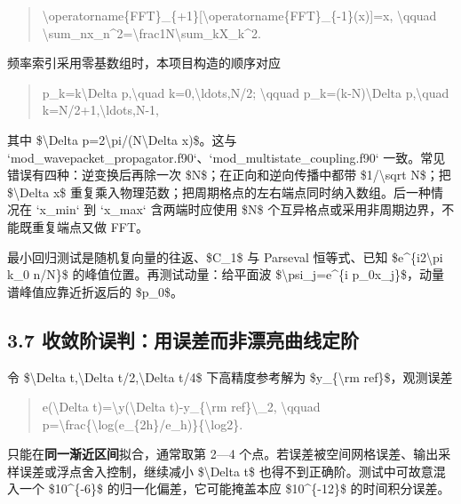 \documentclass[UTF8,openany,11pt,fontset=fandol]{ctexbook}
\begin{document}
\begin{quote}
\textbackslash operatorname\{FFT\}\_\{+1\}{[}\textbackslash operatorname\{FFT\}\_\{-1\}(x){]}=x,
\textbackslash qquad
\textbackslash sum\_n\textbar x\_n\textbar\^{}2=\textbackslash frac1N\textbackslash sum\_k\textbar X\_k\textbar\^{}2.
\end{quote}

频率索引采用零基数组时，本项目构造的顺序对应

\begin{quote}
p\_k=k\textbackslash Delta p,\textbackslash quad
k=0,\textbackslash ldots,N/2; \textbackslash qquad
p\_k=(k-N)\textbackslash Delta p,\textbackslash quad
k=N/2+1,\textbackslash ldots,N-1,
\end{quote}

其中 \$\textbackslash Delta p=2\textbackslash pi/(N\textbackslash Delta
x)\$。这与
`mod\_wavepacket\_propagator.f90`、`mod\_multistate\_coupling.f90`
一致。常见错误有四种：逆变换后再除一次 \$N\$；在正向和逆向传播中都带
\$1/\textbackslash sqrt N\$；把 \$\textbackslash Delta x\$
重复乘入物理范数；把周期格点的左右端点同时纳入数组。后一种情况在
`x\_min` 到 `x\_max` 含两端时应使用 \$N\$
个互异格点或采用非周期边界，不能既重复端点又做 FFT。

最小回归测试是随机复向量的往返、\$C\_1\$ 与 Parseval 恒等式、已知
\$e\^{}\{i2\textbackslash pi k\_0 n/N\}\$
的峰值位置。再测试动量：给平面波 \$\textbackslash psi\_j=e\^{}\{i
p\_0x\_j\}\$，动量谱峰值应靠近折返后的 \$p\_0\$。

\subsection{\texorpdfstring{\textbf{3.7
收敛阶误判：用误差而非漂亮曲线定阶}}{3.7 收敛阶误判：用误差而非漂亮曲线定阶}}\label{ux6536ux655bux9636ux8befux5224ux7528ux8befux5deeux800cux975eux6f02ux4eaeux66f2ux7ebfux5b9aux9636}

令 \$\textbackslash Delta t,\textbackslash Delta
t/2,\textbackslash Delta t/4\$ 下高精度参考解为 \$y\_\{\textbackslash rm
ref\}\$，观测误差

\begin{quote}
e(\textbackslash Delta t)=\textbackslash\textbar y(\textbackslash Delta
t)-y\_\{\textbackslash rm ref\}\textbackslash\textbar\_2,
\textbackslash qquad
p=\textbackslash frac\{\textbackslash log(e\_\{2h\}/e\_h)\}\{\textbackslash log2\}.
\end{quote}

只能在\textbf{同一渐近区间}拟合，通常取第 2---4
个点。若误差被空间网格误差、输出采样误差或浮点舍入控制，继续减小
\$\textbackslash Delta t\$ 也得不到正确阶。测试中可故意混入一个
\$10\^{}\{-6\}\$ 的归一化偏差，它可能掩盖本应 \$10\^{}\{-12\}\$
的时间积分误差。
\end{document}
